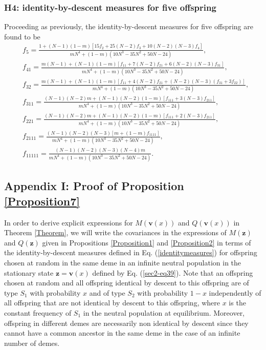 \documentclass[11pt]{article}
\begin{document}
\subsubsection*{H4: identity-by-descent measures for five offspring}
Proceeding as previously, the identity-by-descent measures for five offspring are found to be
\begin{subequations}
\begin{align}
&f_{5}=\frac{1+(N-1)(1-m)[15f_{2}+25(N-2)f_{3}+10(N-2)(N-3)f_{4}]}{mN^4+(1-m) (10 N^3-35N^2+50N-24)},\\
&f_{41}=\frac{
m(N-1)+(N-1)(1-m)[f_{11}+7(N-2)f_{21}+6(N-2)(N-3)f_{31}]
}{mN^4+(1-m) (10 N^3-35N^2+50N-24)},\\
&f_{32}=\frac{
m(N-1)+(N-1)(1-m)[f_{11}+4(N-2)f_{21}+(N-2)(N-3)(f_{31}+3f_{22})]
}{mN^4+(1-m) (10 N^3-35N^2+50N-24)},\\
&f_{311}=\frac{
(N-1)(N-2)m+(N-1)(N-2)(1-m)[f_{111}+3(N-3)f_{211}]
}{mN^4+(1-m) (10 N^3-35N^2+50N-24)},\\
&f_{221}=\frac{
(N-1)(N-2)m+(N-1)(N-2)(1-m)[f_{111}+2(N-3)f_{211}]
}{mN^4+(1-m) (10 N^3-35N^2+50N-24)},\\
&f_{2111}=\frac{(N-1)(N-2)(N-3)[m+(1-m)f_{1111}]}{mN^4+(1-m) (10 N^3-35N^2+50N-24)},\\
&f_{11111}=\frac{(N-1)(N-2)(N-3)(N-4)m}{mN^4+(1-m) (10 N^3-35N^2+50N-24)}.
\end{align}
\end{subequations}



\subsection*{Appendix I: Proof of Proposition \ref{Proposition7} }


In order to derive explicit expressions for $M(\mathbf{v}(x))$ and $Q(\mathbf{v}(x))$ in Theorem \ref{Theorem}, we will write the covariances in the expressions of $M(\mathbf{z})$ and $Q(\mathbf{z})$ given in Propositions \ref{Proposition1} and \ref{Proposition2} in terms of the identity-by-descent measures defined in Eq. (\ref{identitymeasures}) for offspring chosen at random in the same deme in an infinite neutral population in the stationary state $\mathbf{z}=\mathbf{v}(x)$ defined by Eq. (\ref{sec2-eq39}). Note that an offspring chosen at random and all offspring identical by descent to this offspring  are of type $S_1$ with probability $x$ and of type $S_2$ with probability $1-x$ independently of all offspring that are not identical by descent to this offspring, where $x$ is the constant frequency of $S_1$ in the neutral population at equilibrium. Moreover, offspring in different demes are necessarily non identical by descent since they cannot have a common ancestor in the same deme in the case of an infinite number of demes. 
\end{document}
